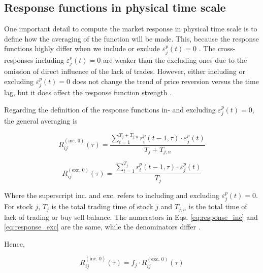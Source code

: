 \subsection{Response functions in physical time scale}
\label{subsec:response_function_physical}

One important detail to compute the market response in physical time scale is
to define how the averaging of the function will be made. This, because the
response functions highly differ when we include or exclude
$\varepsilon^{p}_j \left( t\right) = 0$ \cite{Wang_2016_cross}. The
cross-responses including $\varepsilon^{p}_j \left( t\right) = 0$ are weaker
than the excluding ones due to the omission of direct influence of the lack of
trades. However, either including or excluding
$\varepsilon^{p}_j \left( t\right) = 0$ does not change the trend of price
reversion versus the time lag, but it does affect the response function
strength \cite{Wang_2016_avg}.

Regarding the definition of the response functions in- and excluding
$\varepsilon^{p}_j \left( t\right) = 0$, the general averaging is

\begin{equation}\label{eq:response_inc}
    R_{ij}^{\left(\text{inc. }0\right)}\left(\tau\right)=
    \frac{\sum_{t=1}^{T_{j}+T_{j,n}} r^{p}_{i}\left(t - 1,\tau\right)
    \cdot\varepsilon_{j}^{p}\left(t \right)}{T_{j}+T_{j,n}}
\end{equation}

\begin{equation}\label{eq:response_exc}
    R_{ij}^{\left(\text{exc. }0\right)}\left(\tau\right)=
    \frac{\sum_{t=1}^{T_{j}} r^{p}_{i}\left(t - 1,\tau\right)
    \cdot\varepsilon_{j}^{p} \left(t\right)}{T_{j}}
\end{equation}

Where the superscript inc. and exc. refers to including and excluding
$\varepsilon^{p}_j \left( t\right) = 0$. For stock $j$, $T_j$  is the total
trading time of stock $j$ and $T_{j,n}$ is the total time of lack of trading or
buy sell balance. The numerators in Eqs. \ref{eq:response_inc} and
\ref{eq:response_exc} are the same, while the denominators differ
\cite{Wang_2016_avg}.

Hence,

\begin{equation}\label{eq:relation_response_inc_exc}
    R_{ij}^{\left(\text{inc. }0\right)}\left(\tau\right)=f_{j}
    \cdot R_{ij}^{\left(\text{exc. }0\right)}\left(\tau\right)
\end{equation}

